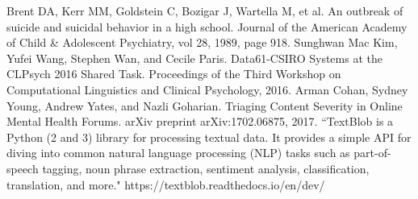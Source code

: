 \documentclass{article}
\begin{document}
\begin{thebibliography}{9}
Brent DA, Kerr MM, Goldstein C, Bozigar J, Wartella M, et al. An outbreak of suicide and suicidal behavior in a high school. Journal of the American Academy of Child \& Adolescent Psychiatry, vol 28, 1989, page 918.
Sunghwan Mac Kim, Yufei Wang, Stephen Wan, and Cecile Paris. Data61-CSIRO Systems at the CLPsych 2016 Shared Task. Proceedings of the Third Workshop on Computational Linguistics and Clinical Psychology, 2016.
Arman Cohan, Sydney Young, Andrew Yates, and Nazli Goharian. Triaging Content Severity in Online Mental Health Forums. arXiv preprint arXiv:1702.06875, 2017.
``TextBlob is a Python (2 and 3) library for processing textual data. It provides a simple API for diving into common natural language processing (NLP) tasks such as part-of-speech tagging, noun phrase extraction, sentiment analysis, classification, translation, and more." https://textblob.readthedocs.io/en/dev/

\end{thebibliography}
\end{document}
